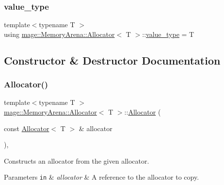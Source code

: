 \subsubsection{\texorpdfstring{value\+\_\+type}{value\_type}}
{\footnotesize\ttfamily template$<$typename T $>$ \\
using \mbox{\hyperlink{classmage_1_1_memory_arena_1_1_allocator}{mage\+::\+Memory\+Arena\+::\+Allocator}}$<$ T $>$\+::\mbox{\hyperlink{classmage_1_1_memory_arena_1_1_allocator_a216e8ae017f9cfeb1676839da11a1b5c}{value\+\_\+type}} =  T}



\subsection{Constructor \& Destructor Documentation}
\mbox{\label{classmage_1_1_memory_arena_1_1_allocator_a2e2645fcc2598ff377c88859ba153606}} 
\subsubsection{\texorpdfstring{Allocator()}{Allocator()}\hspace{0.1cm}{\footnotesize\ttfamily [1/4]}}
{\footnotesize\ttfamily template$<$typename T $>$ \\
\mbox{\hyperlink{classmage_1_1_memory_arena_1_1_allocator}{mage\+::\+Memory\+Arena\+::\+Allocator}}$<$ T $>$\+::\mbox{\hyperlink{classmage_1_1_memory_arena_1_1_allocator}{Allocator}} (\begin{DoxyParamCaption}\item[{const \mbox{\hyperlink{classmage_1_1_memory_arena_1_1_allocator}{Allocator}}$<$ T $>$ \&}]{allocator }\end{DoxyParamCaption})\hspace{0.3cm}{\ttfamily [default]}, {\ttfamily [noexcept]}}

Constructs an allocator from the given allocator.


\begin{DoxyParams}[1]{Parameters}
\mbox{\tt in}  & {\em allocator} & A reference to the allocator to copy. \\
\hline
\end{DoxyParams}
\mbox{\label{classmage_1_1_memory_arena_1_1_allocator_a153cec9d65f697b3e8631c866b2abe96}} 
